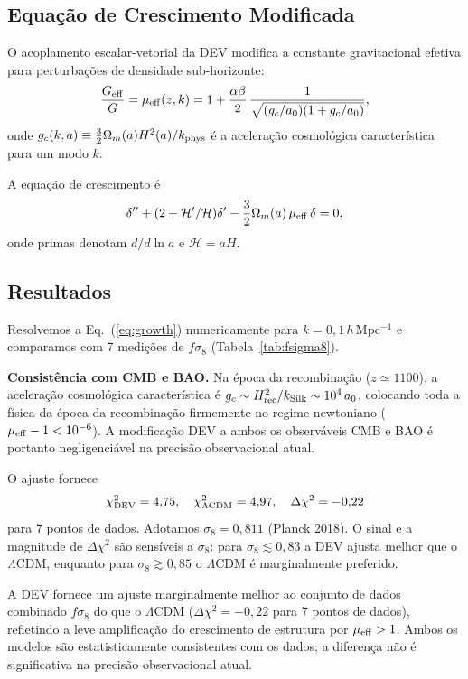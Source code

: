 \documentclass[aps,prd,twocolumn,showpacs,superscriptaddress]{revtex4-2}
\newcommand{\aO}{a_0}
\newcommand{\mueff}{\mu_{\rm eff}}
\newcommand{\LCDM}{$\Lambda$CDM}
\begin{document}
\subsection{Equação de Crescimento Modificada}

O acoplamento escalar-vetorial da DEV modifica a constante
gravitacional efetiva para perturbações de densidade sub-horizonte:
\begin{equation}
  \frac{G_{\rm eff}}{G}
  = \mueff(z,k)
  = 1 + \frac{\alpha\beta}{2}\,
    \frac{1}{\sqrt{(g_c/\aO)(1+g_c/\aO)}},
  \label{eq:mueff}
\end{equation}
onde $g_c(k,a) \equiv \frac{3}{2}\Omega_m(a)H^2(a)/k_{\rm phys}$
é a aceleração cosmológica característica para um modo $k$.

A equação de crescimento é
\begin{equation}
  \delta'' + (2+\mathcal{H}'/\mathcal{H})\delta'
  - \frac{3}{2}\Omega_m(a)\,\mueff\,\delta = 0,
  \label{eq:growth}
\end{equation}
onde primas denotam $d/d\ln a$ e $\mathcal{H} = aH$.

\subsection{Resultados}

Resolvemos a Eq.~(\ref{eq:growth}) numericamente para
$k = 0{,}1\,h\,$Mpc$^{-1}$ e comparamos com 7 medições de $f\sigma_8$
(Tabela~\ref{tab:fsigma8}).

\textbf{Consistência com CMB e BAO.}
Na época da recombinação ($z \simeq 1100$), a aceleração
cosmológica característica é $g_c \sim H_{\rm rec}^2/k_{\rm Silk}
\sim 10^4\,\aO$, colocando toda a física da época da recombinação
firmemente no regime newtoniano ($\mueff - 1 < 10^{-6}$).
A modificação DEV a ambos os observáveis CMB e BAO é portanto
negligenciável na precisão observacional atual.

O ajuste fornece
\begin{equation}
  \chi^2_{\rm DEV} = 4{,}75, \quad
  \chi^2_{\Lambda{\rm CDM}} = 4{,}97, \quad
  \Delta\chi^2 = -0{,}22
\end{equation}
para 7 pontos de dados.
Adotamos $\sigma_8 = 0{,}811$ (Planck 2018).
O sinal e a magnitude de $\Delta\chi^2$ são sensíveis a $\sigma_8$:
para $\sigma_8 \lesssim 0{,}83$ a DEV ajusta melhor que o \LCDM{},
enquanto para $\sigma_8 \gtrsim 0{,}85$ o \LCDM{} é marginalmente
preferido.

A DEV fornece um ajuste marginalmente melhor ao conjunto de dados
combinado $f\sigma_8$ do que o \LCDM{} ($\Delta\chi^2 = -0{,}22$
para 7 pontos de dados), refletindo a leve amplificação do
crescimento de estrutura por $\mueff > 1$.
Ambos os modelos são estatisticamente consistentes com os dados;
a diferença não é significativa na precisão observacional atual.
\end{document}
